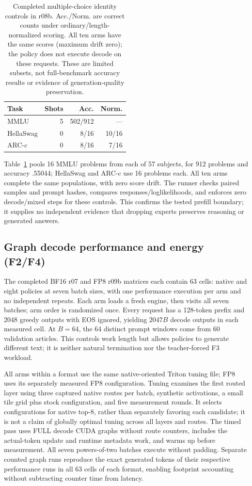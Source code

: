 \documentclass[10pt,twocolumn]{article}
\begin{document}
\begin{table}[t]\centering\footnotesize
\caption{Completed multiple-choice identity controls in r08b. Acc./Norm. are correct counts under ordinary/length-normalized scoring. All ten arms have the same scores (maximum drift zero); the policy does not execute decode on these requests. These are limited subsets, not full-benchmark accuracy results or evidence of generation-quality preservation.}\label{tab:mc-controls}
\begin{tabular}{lrrr}\toprule
Task & Shots & Acc. & Norm.\\\midrule
MMLU & 5 & 502/912 & ---\\
HellaSwag & 0 & 8/16 & 10/16\\
ARC-c & 0 & 8/16 & 7/16\\\bottomrule
\end{tabular}\end{table}

Table~\ref{tab:mc-controls} pools 16 MMLU problems from each of 57 subjects, for 912 problems and accuracy .55044; HellaSwag and ARC-c use 16 problems each. All ten arms complete the same populations, with zero score drift. The runner checks paired samples and prompt hashes, compares responses/loglikelihoods, and enforces zero decode/mixed steps for these controls. This confirms the tested prefill boundary; it supplies no independent evidence that dropping experts preserves reasoning or generated answers.

\subsection{Graph decode performance and energy (F2/F4)}
The completed BF16 r07 and FP8 r09b matrices each contain 63 cells: native and eight policies at seven batch sizes, with one performance execution per arm and no independent repeats. Each arm loads a fresh engine, then visits all seven batches; arm order is randomized once. Every request has a 128-token prefix and 2048 greedy outputs with EOS ignored, yielding $2047B$ decode outputs in each measured cell. At $B=64$, the 64 distinct prompt windows come from 60 validation articles. This controls work length but allows policies to generate different text; it is neither natural termination nor the teacher-forced F3 workload.

All arms within a format use the same native-oriented Triton tuning file; FP8 uses its separately measured FP8 configuration. Tuning examines the first routed layer using three captured native routes per batch, synthetic activations, a small tile grid plus stock configuration, and five measurement rounds. It selects configurations for native top-8, rather than separately favoring each candidate; it is not a claim of globally optimal tuning across all layers and routes. The timed pass uses FULL decode CUDA graphs without route counters, includes the actual-token update and runtime metadata work, and warms up before measurement. All seven powers-of-two batches execute without padding. Separate counted graph runs reproduce the exact generated tokens of their respective performance runs in all 63 cells of each format, enabling footprint accounting without subtracting counter time from latency.
\end{document}
